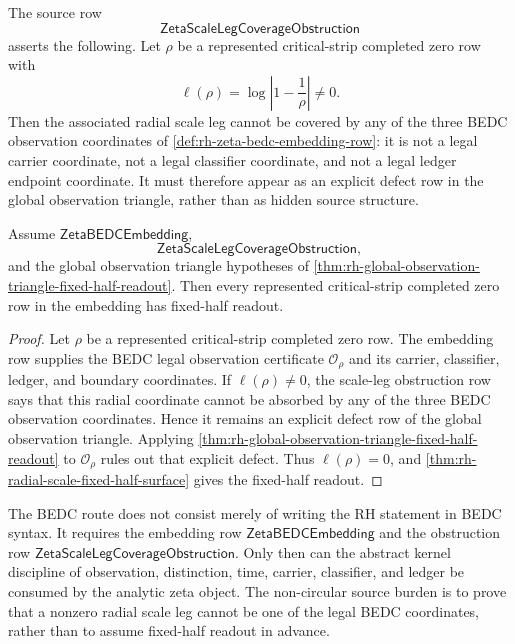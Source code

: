 \begin{definition}
\label{def:rh-zeta-scale-leg-coverage-obstruction}
The source row
$$
\mathsf{ZetaScaleLegCoverageObstruction}
$$
asserts the following.  Let $\rho$ be a represented critical-strip
completed zero row with
$$
\ell(\rho)=\log\left|1-\frac1\rho\right|\ne0.
$$
Then the associated radial scale leg cannot be covered by any of the
three BEDC observation coordinates of
\autoref{def:rh-zeta-bedc-embedding-row}: it is not a legal carrier
coordinate, not a legal classifier coordinate, and not a legal ledger
endpoint coordinate.  It must therefore appear as an explicit defect
row in the global observation triangle, rather than as hidden source
structure.
\end{definition}

\begin{theorem}
\label{thm:rh-embedding-scale-obstruction-fixed-half-readout}
Assume $\mathsf{ZetaBEDCEmbedding}$,
$$
\mathsf{ZetaScaleLegCoverageObstruction},
$$
and the global observation triangle hypotheses of
\autoref{thm:rh-global-observation-triangle-fixed-half-readout}.  Then
every represented critical-strip completed zero row in the embedding has
fixed-half readout.
\end{theorem}

\begin{proof}
Let $\rho$ be a represented critical-strip completed zero row.  The
embedding row supplies the BEDC legal observation certificate
$\mathcal O_\rho$ and its carrier, classifier, ledger, and boundary
coordinates.  If $\ell(\rho)\ne0$, the scale-leg obstruction row says
that this radial coordinate cannot be absorbed by any of the three BEDC
observation coordinates.  Hence it remains an explicit defect row of
the global observation triangle.  Applying
\autoref{thm:rh-global-observation-triangle-fixed-half-readout} to
$\mathcal O_\rho$ rules out that explicit defect.  Thus
$\ell(\rho)=0$, and
\autoref{thm:rh-radial-scale-fixed-half-surface} gives the fixed-half
readout.
\end{proof}

\begin{principle}
\label{prin:rh-boundary-bedc-route}
The BEDC route does not consist merely of writing the RH statement in
BEDC syntax.  It requires the embedding row
$\mathsf{ZetaBEDCEmbedding}$ and the obstruction row
$\mathsf{ZetaScaleLegCoverageObstruction}$.  Only then can the abstract
kernel discipline of observation, distinction, time, carrier,
classifier, and ledger be consumed by the analytic zeta object.  The
non-circular source burden is to prove that a nonzero radial scale leg
cannot be one of the legal BEDC coordinates, rather than to assume
fixed-half readout in advance.
\end{principle}


